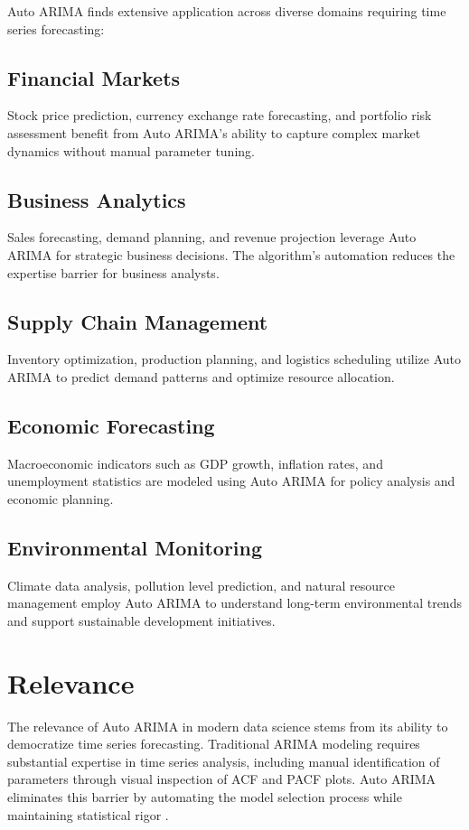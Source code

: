 Auto ARIMA finds extensive application across diverse domains requiring time series forecasting:

\subsection{Financial Markets}
Stock price prediction, currency exchange rate forecasting, and portfolio risk assessment benefit from Auto ARIMA's ability to capture complex market dynamics without manual parameter tuning.

\subsection{Business Analytics}
Sales forecasting, demand planning, and revenue projection leverage Auto ARIMA for strategic business decisions. The algorithm's automation reduces the expertise barrier for business analysts.

\subsection{Supply Chain Management}
Inventory optimization, production planning, and logistics scheduling utilize Auto ARIMA to predict demand patterns and optimize resource allocation.

\subsection{Economic Forecasting}
Macroeconomic indicators such as GDP growth, inflation rates, and unemployment statistics are modeled using Auto ARIMA for policy analysis and economic planning.

\subsection{Environmental Monitoring}
Climate data analysis, pollution level prediction, and natural resource management employ Auto ARIMA to understand long-term environmental trends and support sustainable development initiatives.

\section{Relevance}
\label{sec:relevance}

The relevance of Auto ARIMA in modern data science stems from its ability to democratize time series forecasting. Traditional ARIMA modeling requires substantial expertise in time series analysis, including manual identification of parameters through visual inspection of ACF and PACF plots. Auto ARIMA eliminates this barrier by automating the model selection process while maintaining statistical rigor \cite{HyndmanKhandakar:2008}.\\

